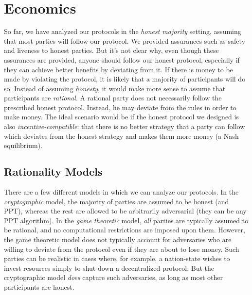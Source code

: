\chapter{Economics}\label{chapter.economics}

So far, we have analyzed our protocols in the \emph{honest majority} setting,
assuming that most parties will follow our protocol. We provided assurances
such as safety and liveness to honest parties. But it's not clear why,
even though these assurances are provided, anyone should follow our honest
protocol, especially if they can achieve better benefits by deviating from
it. If there is money to be made by violating the protocol, it is likely that
a majority of participants will do so. Instead of assuming \emph{honesty},
it would make more sense to assume that participants are \emph{rational}.
A rational party does not necessarily follow the prescribed honest protocol.
Instead, he may deviate from the rules in order to make money.
The ideal scenario would be if the honest protocol we designed is also
\emph{incentive-compatible}:
that there is no better strategy that
a party can follow which deviates from the honest strategy and makes them
more money (a Nash equilibrium).

\section{Rationality Models}

There are a few different models in which we can analyze our protocols.
In the \emph{cryptographic} model, the majority of parties are assumed
to be honest (and PPT), whereas the rest are allowed to be arbitrarily
adversarial (they can be any PPT algorithm). In the \emph{game theoretic}
model, \emph{all} parties are typically assumed to be rational, and
no computational restrictions are imposed upon them. However, the game
theoretic model does not typically account for adversaries who are willing
to deviate from the protocol even if they are about to lose money. Such
parties can be realistic in cases where, for example, a nation-state
wishes to invest resources simply to shut down a decentralized protocol.
But the cryptographic model \emph{does} capture such adversaries, as
long as most other participants are honest.

